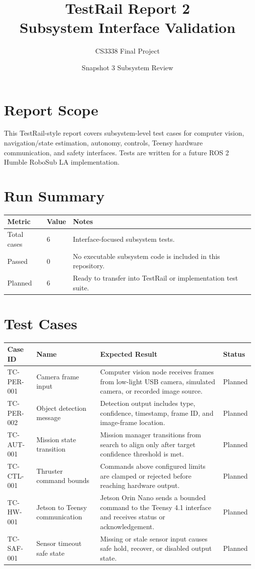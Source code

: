 \documentclass[12pt]{article}
\title{TestRail Report 2\\Subsystem Interface Validation}
\author{CS3338 Final Project}
\date{Snapshot 3 Subsystem Review}
\begin{document}
\maketitle

\section{Report Scope}
This TestRail-style report covers subsystem-level test cases for computer vision, navigation/state estimation, autonomy, controls, Teensy hardware communication, and safety interfaces. Tests are written for a future ROS 2 Humble RoboSub LA implementation.

\section{Run Summary}
\begin{longtable}{|p{}|p{}|p{}|}
\hline
\textbf{Metric} & \textbf{Value} & \textbf{Notes} \\
\hline
Total cases & 6 & Interface-focused subsystem tests. \\
\hline
Passed & 0 & No executable subsystem code is included in this repository. \\
\hline
Planned & 6 & Ready to transfer into TestRail or implementation test suite. \\
\hline
\end{longtable}

\section{Test Cases}
\begin{longtable}{|p{}|p{}|p{}|p{}|}
\hline
\textbf{Case ID} & \textbf{Name} & \textbf{Expected Result} & \textbf{Status} \\
\hline
TC-PER-001 & Camera frame input & Computer vision node receives frames from low-light USB camera, simulated camera, or recorded image source. & Planned \\
\hline
TC-PER-002 & Object detection message & Detection output includes type, confidence, timestamp, frame ID, and image-frame location. & Planned \\
\hline
TC-AUT-001 & Mission state transition & Mission manager transitions from search to align only after target confidence threshold is met. & Planned \\
\hline
TC-CTL-001 & Thruster command bounds & Commands above configured limits are clamped or rejected before reaching hardware output. & Planned \\
\hline
TC-HW-001 & Jetson to Teensy communication & Jetson Orin Nano sends a bounded command to the Teensy 4.1 interface and receives status or acknowledgement. & Planned \\
\hline
TC-SAF-001 & Sensor timeout safe state & Missing or stale sensor input causes safe hold, recover, or disabled output state. & Planned \\
\hline
\end{longtable}
\end{document}
